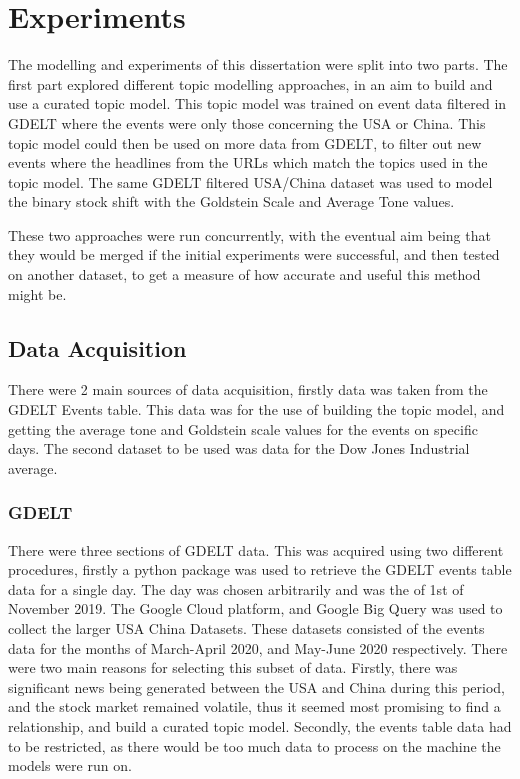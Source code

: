 \section{Experiments}
\label{experiments}
The modelling and experiments of this dissertation were split into two parts. The first part explored different topic modelling approaches, in an aim to build and use a curated topic model. This topic model was trained on event data filtered in GDELT where the events were only those concerning the USA or China. This topic model could then be used on more data from GDELT, to filter out new events where the headlines from the URLs which match the topics used in the topic model. The same GDELT filtered USA/China dataset was used to model the binary stock shift with the Goldstein Scale and Average Tone values. 

These two approaches were run concurrently, with the eventual aim being that they would be merged if the initial experiments were successful, and then tested on another dataset, to get a measure of how accurate and useful this method might be. 

\subsection{Data Acquisition}
There were 2 main sources of data acquisition, firstly data was taken from the GDELT Events table. This data was for the use of building the topic model, and getting the average tone and Goldstein scale values for the events on specific days. The second dataset to be used was data for the Dow Jones Industrial average.
\subsubsection{GDELT}
There were three sections of GDELT data. This was acquired using two different procedures, firstly a python package was used to retrieve the GDELT events table data for a single day. The day was chosen arbitrarily and was the of 1st of November 2019. The Google Cloud platform, and Google Big Query was used to collect the larger USA China Datasets. These datasets consisted of the events data for the months of March-April 2020, and May-June 2020 respectively. There were two main reasons for selecting this subset of data. Firstly, there was significant news being generated between the USA and China during this period, and the stock market remained volatile, thus it seemed most promising to find a relationship, and build a curated topic model. Secondly, the events table data had to be restricted, as there would be too much data to process on the machine the models were run on. 

